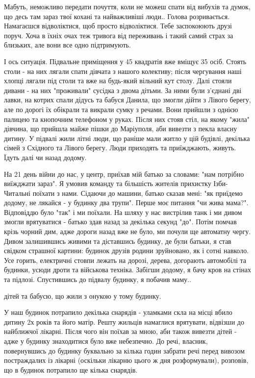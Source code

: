 Мабуть, неможливо передати почуття, коли не можеш спати від вибухів та думок,
що десь там зараз твої кохані та найважливіші люди.. Голова розривається.
Намагаєшся відволіктися, щоб просто відволіктися. Тебе заспокоюють друзі поруч.
Хоча в їхніх очах теж тривога від переживань і такий самий страх за близьких,
але вони все одно підтримують.

І ось ситуація. Підвальне приміщення у 45 квадратів вже вміщує 35 осіб. Стоять
столи - на них лягали спати дівчата з нашого колективу; після чергування наші
хлопці лягали під столи та вже на будь-який вільний кут столу. Далі стояли
дивани - на них "проживали" сусідка з двома дітьми. За ними були з'єднані дві
лавки, на котрих спали дідусь та бабуся Данила, що змогли дійти з Лівого
берегу, але по дорогі їх обікрали та викрали сумку з речами. Вони прийшли з
однією палицею та кнопочним телефоном у руках. Після них стояв стіл, на якому
"жила" дівчина, що прийшла майже пішки до Маріуполя, аби вивезти з пекла власну
дитину. У підвалі жили літні люди, що раніше мали житло у цій будівлі, декілька
сімей з Східного та Лівого берегу. Люди приходять та приїжджають, живуть. Їдуть
далі чи назад додому.  

На 21 день війни до нас, у центр, приїхав мій батько за словами: "нам потрібно
виїжджати зараз". Я умовив команду та більшість жителів прихистку Ізби-Читальні
поїхати з нами. Сідаючи до машини, батько сказав мені: "як приїдемо додому, не
лякайся - у будинку два трупи". Перше моє питання "чи жива мама?". Відповіддю
було "так" і ми поїхали. На шляху у нас вистрілив танк і ми дивом змогли
врятуватися - батько здав назад за декілька секунд "до". Потім помчав крізь
чорний дим, адже дороги назад вже не було, ми почули ще автоматну чергу. Дивом
залишившись живими та діставшись будинку, де були батьки, я став свідком
страшної картини: будинок друзів родини зруйновано, як і сотні навколо. Усе
горить, електричні стовпи лежать на дорозі, дерева, догорають автомобілі та
будинки, усюди дроти та військова техніка. Забігши додому, я бачу кров на
стінах та підлозі. Спустившись до підвалу будинку, я побачив маму..

дітей та бабусю, що жили з онукою у тому будинку. 

У наш будинок потрапило декілька снарядів - уламками скла на місці вбило дитину
2х років та його матір. Решту жильців намаглися врятувати, відвізши до
найближчої лікарні. Після чого він поїхав за мною, аби також вивезти дітей -
адже у будинку знаходитися було вже небезпечно. До речі, власник, повернувшись
до будинку буквально за кілька годин забрати речі перед вивозом постраждалих із
лікарні (оскільки лікарню цього ж дня розформували), розповів, що в будинок
потрапило ще кілька снарядів. 

